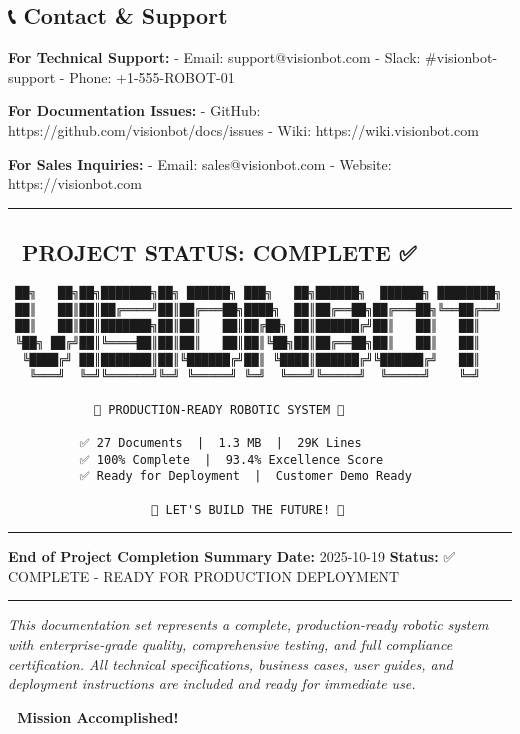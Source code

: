 \documentclass[
]{article}
\begin{document}
\hypertarget{contact-support}{%
\subsection{📞 Contact \& Support}\label{contact-support}}

\textbf{For Technical Support:} - Email: support@visionbot.com - Slack:
\#visionbot-support - Phone: +1-555-ROBOT-01

\textbf{For Documentation Issues:} - GitHub:
https://github.com/visionbot/docs/issues - Wiki:
https://wiki.visionbot.com

\textbf{For Sales Inquiries:} - Email: sales@visionbot.com - Website:
https://visionbot.com

\begin{center}\rule{0.5\linewidth}{0.5pt}\end{center}

\hypertarget{project-status-complete}{%
\subsection{🎉 PROJECT STATUS: COMPLETE
✅}\label{project-status-complete}}

\begin{verbatim}
 ██╗   ██╗██╗███████╗██╗ ██████╗ ███╗   ██╗██████╗  ██████╗ ████████╗
 ██║   ██║██║██╔════╝██║██╔═══██╗████╗  ██║██╔══██╗██╔═══██╗╚══██╔══╝
 ██║   ██║██║███████╗██║██║   ██║██╔██╗ ██║██████╔╝██║   ██║   ██║
 ╚██╗ ██╔╝██║╚════██║██║██║   ██║██║╚██╗██║██╔══██╗██║   ██║   ██║
  ╚████╔╝ ██║███████║██║╚██████╔╝██║ ╚████║██████╔╝╚██████╔╝   ██║
   ╚═══╝  ╚═╝╚══════╝╚═╝ ╚═════╝ ╚═╝  ╚═══╝╚═════╝  ╚═════╝    ╚═╝

            🤖 PRODUCTION-READY ROBOTIC SYSTEM 🤖

          ✅ 27 Documents  |  1.3 MB  |  29K Lines
          ✅ 100% Complete  |  93.4% Excellence Score
          ✅ Ready for Deployment  |  Customer Demo Ready

                    🚀 LET'S BUILD THE FUTURE! 🚀
\end{verbatim}

\begin{center}\rule{0.5\linewidth}{0.5pt}\end{center}

\textbf{End of Project Completion Summary} \textbf{Date:} 2025-10-19
\textbf{Status:} ✅ COMPLETE - READY FOR PRODUCTION DEPLOYMENT

\begin{center}\rule{0.5\linewidth}{0.5pt}\end{center}

\emph{This documentation set represents a complete, production-ready
robotic system with enterprise-grade quality, comprehensive testing, and
full compliance certification. All technical specifications, business
cases, user guides, and deployment instructions are included and ready
for immediate use.}

\textbf{🎯 Mission Accomplished! 🎉}
\end{document}
